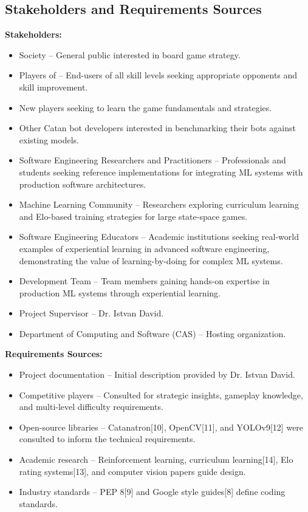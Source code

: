 \documentclass{article}
\begin{document}
\subsection{Stakeholders and Requirements Sources}\label{subsec:stakeholders-and-requirements-sources}
\textbf{Stakeholders:}
\begin{itemize}
    \item Society – General public interested in board game strategy.
    \item Players of \emph{\Catan{}} – End-users of all skill levels seeking appropriate opponents and skill improvement.
    \item New players seeking to learn the game fundamentals and strategies.
    \item Other Catan bot developers interested in benchmarking their bots against existing models.
    \item Software Engineering Researchers and Practitioners – Professionals and students seeking reference implementations for integrating ML systems with production software architectures.
    \item Machine Learning Community – Researchers exploring curriculum learning and Elo-based training strategies for large state-space games.
    \item Software Engineering Educators – Academic institutions seeking real-world examples of experiential learning in advanced software engineering, demonstrating the value of learning-by-doing for complex ML systems.
    \item Development Team – Team members gaining hands-on expertise in production ML systems through experiential learning.
    \item Project Supervisor – Dr. Istvan David.
    \item Department of Computing and Software (CAS) – Hosting organization.
\end{itemize}

\noindent\textbf{Requirements Sources:}
\begin{itemize}
    \item Project documentation – Initial description provided by Dr. Istvan David.
    \item Competitive \emph{\Catan{}} players – Consulted for strategic insights, gameplay knowledge, and multi-level difficulty requirements.
    \item Open-source libraries – Catanatron[10], OpenCV[11], and YOLOv9[12] were consulted to inform the technical requirements.
    \item Academic research – Reinforcement learning, curriculum learning[14], Elo rating systems[13], and computer vision papers guide \AI{} design.
    \item Industry standards – PEP 8[9] and Google style guides[8] define coding standards.
\end{itemize}
\end{document}
